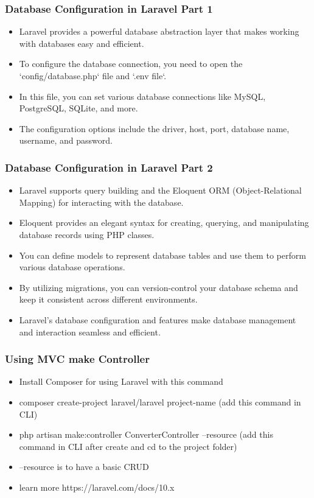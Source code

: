 \documentclass[aspectratio=169, table]{beamer}
\begin{document}
\begin{frame}[fragile]
    \frametitle{Database Configuration in Laravel Part 1}
    \begin{itemize}
        \item Laravel provides a powerful database abstraction layer that makes working with databases easy and efficient.
        \item To configure the database connection, you need to open the `config/database.php` file and `.env file`.
        \item In this file, you can set various database connections like MySQL, PostgreSQL, SQLite, and more.
        \item The configuration options include the driver, host, port, database name, username, and password.
    \end{itemize}
\end{frame}

\begin{frame}[fragile]
    \frametitle{Database Configuration in Laravel Part 2}
    \begin{itemize}
        \item Laravel supports query building and the Eloquent ORM (Object-Relational Mapping) for interacting with the database.
        \item Eloquent provides an elegant syntax for creating, querying, and manipulating database records using PHP classes.
        \item You can define models to represent database tables and use them to perform various database operations.
        \item By utilizing migrations, you can version-control your database schema and keep it consistent across different environments.
        \item Laravel's database configuration and features make database management and interaction seamless and efficient.
    \end{itemize}
\end{frame}


\begin{frame}[fragile]
    \frametitle{Using MVC make Controller}
    \begin{itemize}
        \item Install Composer for using Laravel with this command
        \item composer create-project laravel/laravel project-name (add this command in CLI)
        \item php artisan make:controller ConverterController --resource (add this command in CLI after create and cd to the project folder)
        \item --resource is to have a basic CRUD
        \item learn more https://laravel.com/docs/10.x
    \end{itemize}
\end{frame}
\end{document}
